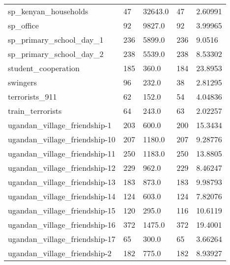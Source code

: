 \begin{longtable}{lllll}
 sp\_kenyan\_households                               & 47         & 32643.0     & 47    & 2.60991    \\
 sp\_office                                          & 92         & 9827.0      & 92    & 3.99965    \\
 sp\_primary\_school\_day\_1                            & 236        & 5899.0      & 236   & 9.0516     \\
 sp\_primary\_school\_day\_2                            & 238        & 5539.0      & 238   & 8.53302    \\
 student\_cooperation                                & 185        & 360.0       & 184   & 23.8953    \\
 swingers                                           & 96         & 232.0       & 38    & 2.81295    \\
 terrorists\_911                                     & 62         & 152.0       & 54    & 4.04836    \\
 train\_terrorists                                   & 64         & 243.0       & 63    & 2.02257    \\
 ugandan\_village\_friendship-1                       & 203        & 600.0       & 200   & 15.3434    \\
 ugandan\_village\_friendship-10                      & 207        & 1180.0      & 207   & 9.28776    \\
 ugandan\_village\_friendship-11                      & 250        & 1183.0      & 250   & 13.8805    \\
 ugandan\_village\_friendship-12                      & 229        & 962.0       & 229   & 8.46247    \\
 ugandan\_village\_friendship-13                      & 183        & 873.0       & 183   & 9.98793    \\
 ugandan\_village\_friendship-14                      & 124        & 603.0       & 124   & 7.82076    \\
 ugandan\_village\_friendship-15                      & 120        & 295.0       & 116   & 10.6119    \\
 ugandan\_village\_friendship-16                      & 372        & 1475.0      & 372   & 19.4001    \\
 ugandan\_village\_friendship-17                      & 65         & 300.0       & 65    & 3.66264    \\
 ugandan\_village\_friendship-2                       & 182        & 775.0       & 182   & 8.93927    \\

\end{longtable}
